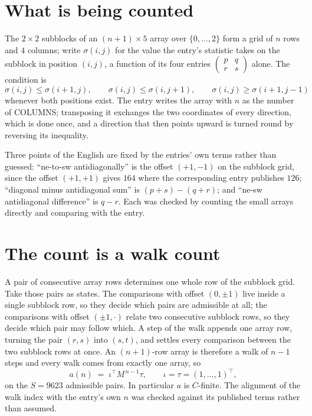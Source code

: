 \documentclass[11pt,a4paper]{article}
\theoremstyle{plain}
\theoremstyle{definition}
\begin{document}
\section{What is being counted}

The $2\times2$ subblocks of an $(n+1)\times5$ array over $\{0,\dots,2\}$ form a grid
of $n$ rows and $4$ columns; write $\sigma(i,j)$ for the value the entry's statistic takes on
the subblock in position $(i,j)$, a function of its four entries
$\begin{pmatrix}p&q\\r&s\end{pmatrix}$ alone. The condition is
\[
\sigma(i,j)\le\sigma(i+1,j),\qquad \sigma(i,j)\le\sigma(i,j+1),\qquad \sigma(i,j)\ge\sigma(i+1,j-1)
\]
whenever both positions exist. The entry writes the array with $n$ as the number of COLUMNS; transposing it exchanges the two coordinates of every direction, which is done once, and a direction that then points upward is turned round by reversing its inequality.

Three points of the English are fixed by the entries' own terms rather than guessed:
``ne-to-sw antidiagonally'' is the offset $(+1,-1)$ on the subblock grid, since the offset
$(+1,+1)$ gives $164$ where the corresponding entry publishes $126$; ``diagonal minus
antidiagonal sum'' is $(p+s)-(q+r)$; and ``ne-sw antidiagonal difference'' is $q-r$. Each was
checked by counting the small arrays directly and comparing with the entry.

\section{The count is a walk count}

A pair of consecutive array rows determines one whole row of the subblock grid. Take those
pairs as states. The comparisons with offset $(0,\pm1)$ live inside a single subblock row, so
they decide which pairs are admissible at all; the comparisons with offset $(\pm1,\cdot)$
relate two consecutive subblock rows, so they decide which pair may follow which. A step of the
walk appends one array row, turning the pair $(r,s)$ into $(s,t)$, and settles every comparison
between the two subblock rows at once. An $(n+1)$-row array is therefore a walk of $n-1$ steps
and every walk comes from exactly one array, so
\[
a(n)\;=\;\iota^{\!\top}M^{\,n-1}\tau,\qquad \iota=\tau=(1,\dots,1)^{\!\top},
\]
on the $S=9623$ admissible pairs. In particular $a$ is $C$-finite. The alignment of the walk
index with the entry's own $n$ was checked against its published terms rather than assumed.
\end{document}
